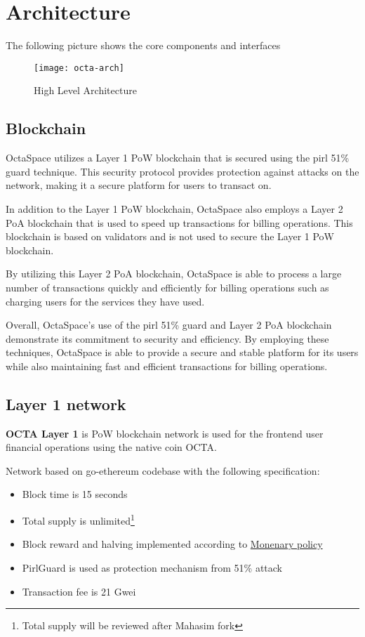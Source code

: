 \section{Architecture}

The following picture shows the core components and interfaces

\begin{figure}[h]
    \centering
    \texttt{[image: octa-arch]}
    \caption{High Level Architecture}
\end{figure}

\subsection{Blockchain}
OctaSpace utilizes a Layer 1 PoW blockchain that is secured using the pirl 51\% guard technique. This security protocol provides protection against attacks on the network, making it a secure platform for users to transact on.

In addition to the Layer 1 PoW blockchain, OctaSpace also employs a Layer 2 PoA blockchain that is used to speed up transactions for billing operations. This blockchain is based on validators and is not used to secure the Layer 1 PoW blockchain.

By utilizing this Layer 2 PoA blockchain, OctaSpace is able to process a large number of transactions quickly and efficiently for billing operations such as charging users for the services they have used.

Overall, OctaSpace's use of the pirl 51\% guard and Layer 2 PoA blockchain demonstrate its commitment to security and efficiency. By employing these techniques, OctaSpace is able to provide a secure and stable platform for its users while also maintaining fast and efficient transactions for billing operations.

\newpage

\subsection{Layer 1 network}

\textbf{OCTA Layer 1} is PoW\cite{pow} blockchain network is used for the frontend user financial operations using the native coin OCTA.

Network based on go-ethereum\cite{go-ethereum} codebase with the following specification:

\begin{itemize}
    \item Block time is 15 seconds
    \item Total supply is unlimited\footnote{Total supply will be reviewed after Mahasim fork}
    \item Block reward and halving implemented according to \hyperref[sec:mp]{Monenary policy}
    \item PirlGuard is used as protection mechanism from 51\% attack
    \item Transaction fee is 21 Gwei
\end{itemize}

